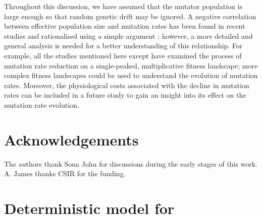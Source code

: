 \documentclass[preprint,12pt,number]{elsarticle}
\begin{document}
Throughout this discussion, we have assumed that the mutator population is large enough so that random genetic drift may be ignored. A negative correlation between effective population size and  mutation rates has been found in recent studies \citep{Sung:2012,Lynch:2010b} and rationalised using a simple argument \citep{Lynch:2011,James:2016}; however, a more detailed and general analysis is needed for a better understanding of this relationship. 
For example, all the studies mentioned here except \citep{James:2016b} have examined the process of mutation rate reduction on a single-peaked, multiplicative fitness landscape; more complex fitness landscapes \citep{Visser:2014} could be used to understand the evolution of mutation rates. Moreover, the physiological costs \citep{Kimura:1967, Kondrashov:1995, Dawson:1998, Johnson:1999a, Baer:2007} associated with the decline in mutation rates can be included in a future  study to gain an insight into its effect on the mutation rate evolution. 


\section*{Acknowledgements}
The authors thank Sona John for discussions during the early stages of this work. A. James thanks CSIR for the funding.  


\clearpage
\appendix

\setcounter{section}{0}
\setcounter{equation}{0}
\makeatletter 
\renewcommand{\thesection}{A\@arabic\c@section} 
\renewcommand{\theequation}{A\@arabic\c@equation} 
\bigskip

\section{Deterministic model for }
\label{app_det}
\end{document}
